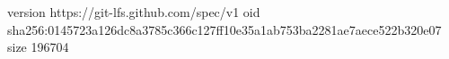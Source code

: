 version https://git-lfs.github.com/spec/v1
oid sha256:0145723a126dc8a3785c366c127ff10e35a1ab753ba2281ae7aece522b320e07
size 196704
